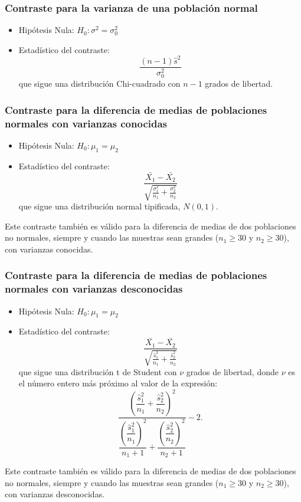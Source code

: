 \subsubsection{Contraste para la varianza de una población
normal}
\begin{itemize}
\item Hipótesis Nula: $H_0:\sigma^2=\sigma_0^2$
\item Estadístico del contraste:
\[
\frac{(n - 1)\hat s^2}{\sigma_0^2 }
\]
que sigue una distribución Chi-cuadrado con $n-1$ grados de libertad.
\end{itemize}

\subsubsection{Contraste para la diferencia de medias de poblaciones normales con
varianzas conocidas}
\begin{itemize}
\item Hipótesis Nula: $H_0:\mu_1=\mu_2$
\item Estadístico del contraste:
\[
\frac{\bar{X_1}-\bar{X_2}}{\sqrt{\frac{\sigma_1^2}{n_1 }+\frac{\sigma_2^2}{n_2}}}
\]
que sigue una distribución normal tipificada, $N(0,1)$.
\end{itemize}

Este contraste también es válido para la diferencia de medias de dos poblaciones no normales, siempre y cuando las muestras sean
grandes ($n_1\geq 30$ y $n_2\geq 30$), con varianzas conocidas.

\subsubsection{Contraste para la diferencia de medias de poblaciones normales con varianzas desconocidas}
\begin{itemize}
\item Hipótesis Nula: $H_0:\mu_1=\mu_2$
\item Estadístico del contraste:
\[
\frac{\bar{X_1}-\bar{X_2}}{\sqrt{\frac{\hat s_1^2}{n_1}+\frac{\hat s_2^2}{n_2}}}
\]
que sigue una distribución t de Student con $\nu$ grados de libertad, donde $\nu$ es el número entero más próximo al valor de la
expresión:
\[
\dfrac{\left( \dfrac{\hat s_1^2}{n_1}+\dfrac{\hat s_2^2}{n_2}\right)^2}{\dfrac{\left(
\dfrac{\hat s_1^2}{n_1}\right)^{2}}{n_1+1}+\dfrac{\left( \dfrac{\hat s_2^2}{n_2}\right) ^2}{n_2+1}}-2.
\]
\end{itemize}

Este contraste también es válido para la diferencia de medias de dos poblaciones no normales, siempre y cuando las muestras sean
grandes ($n_1\geq 30$ y $n_2\geq 30$), con varianzas desconocidas.

